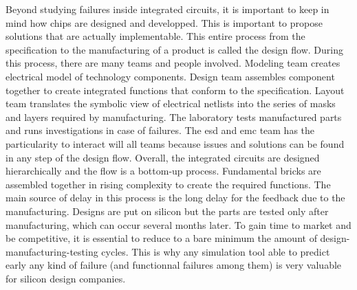 Beyond studying failures inside integrated circuits, it is important to keep in mind how chips are designed and developped.
This is important to propose solutions that are actually implementable.
This entire process from the specification to the manufacturing of a product is called the design flow.
During this process, there are many teams and people involved.
Modeling team creates electrical model of technology components.
Design team assembles component together to create integrated functions that conform to the specification.
Layout team translates the symbolic view of electrical netlists into the series of masks and layers required by manufacturing.
The laboratory tests manufactured parts and runs investigations in case of failures.
The \gls{esd} and \gls{emc} team has the particularity to interact will all teams because issues and solutions can be found in any step of the design flow.
Overall, the integrated circuits are designed hierarchically and the flow is a bottom-up process.
Fundamental bricks are assembled together in rising complexity to create the required functions.
The main source of delay in this process is the long delay for the feedback due to the manufacturing.
Designs are put on silicon but the parts are tested only after manufacturing, which can occur several months later.
To gain time to market and be competitive, it is essential to reduce to a bare minimum the amount of design-manufacturing-testing cycles.
This is why any simulation tool able to predict early any kind of failure (and functionnal failures among them) is very valuable for silicon design companies.

